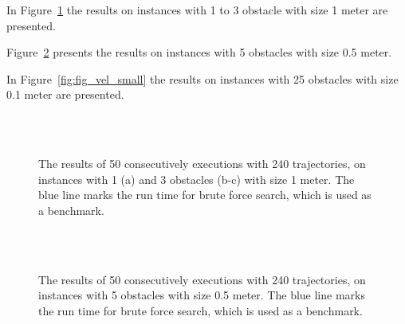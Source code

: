In Figure~\ref{fig:fig_vel_big} the results on instances with 1 to 3 obstacle with size 1 meter are presented. 

Figure~\ref{fig:fig_vel_medium} presents the results on instances with 5 obstacles with size 0.5 meter.  

In Figure~\ref{fig:fig_vel_small} the results on instances with 25 obstacles with size 0.1 meter are presented.

\begin{figure}[thpb]
   \myfloatalign
    \tiny
          \centering
    \\
    \\
    \caption[Experiment: Big obstacle instances with different velocity bounds]{The results of 50 consecutively executions with 240 trajectories, on instances with 1 (a) and 3 obstacles (b-c) with size 1 meter. The blue line marks the run time for brute force search, which is used as a benchmark.}  
     \label{fig:fig_vel_big}
\end{figure}

\begin{figure}[thpb]
   \myfloatalign
    \tiny
          \centering
    \\
    \\
    \caption[Experiment: Medium obstacle instances with different velocity bounds]{The results of 50 consecutively executions with 240 trajectories, on instances with 5 obstacles with size 0.5 meter. The blue line marks the run time for brute force search, which is used as a benchmark.}  
     \label{fig:fig_vel_medium}
\end{figure} 


